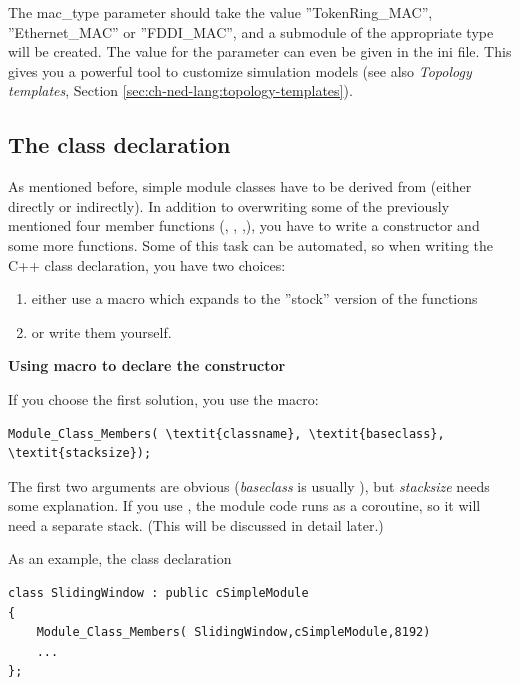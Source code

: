 \begin{sloppypar}
The mac\_type parameter should take the value ''TokenRing\_MAC'',
''Ethernet\_MAC'' or ''FDDI\_MAC'', and a submodule of the appropriate
type will be created. The value for the parameter can even be given in
the ini file. This gives you a powerful tool to customize simulation
models (see also \textit{Topology templates}, Section
\ref{sec:ch-ned-lang:topology-templates}).
\end{sloppypar}




\subsection{The class declaration}

As mentioned before, simple module classes have
to be derived from  (either directly or
indirectly). In addition to overwriting some of the previously
mentioned four member functions (,
, ,), you
have to write a constructor and some more
functions. Some of this task can be automated, so when writing the C++
class declaration, you have two choices:
\begin{enumerate}
\item{either use a macro which expands to the ''stock'' version of the
    functions}
\item{or write them yourself.}
\end{enumerate}

\textbf{Using macro to declare the constructor}

If you choose the first solution, you use the
 macro:

\begin{Verbatim}[commandchars=\\\{\}]
Module_Class_Members( \textit{classname}, \textit{baseclass}, \textit{stacksize});
\end{Verbatim}

The first two arguments are obvious (\textit{baseclass} is usually ),
but \textit{stacksize} needs some explanation. If you use ,
the module code runs as a coroutine, so it will need a separate
stack. (This will be discussed in detail later.)


As an example, the class declaration

\begin{verbatim}
class SlidingWindow : public cSimpleModule
{
    Module_Class_Members( SlidingWindow,cSimpleModule,8192)
    ...
};
\end{verbatim}


